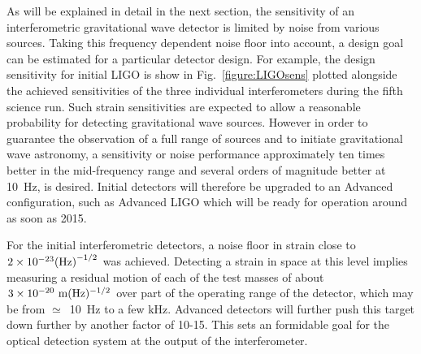 \documentclass{article}
\begin{document}
As will be explained in detail in the next section, the sensitivity of
an interferometric gravitational wave detector is limited by noise
from various sources. Taking this frequency dependent noise floor into
account, a design goal can be estimated for a particular detector design.
For example, the design sensitivity for initial LIGO is show in Fig.~\ref{figure:LIGOsens}
plotted alongside the achieved sensitivities of the three individual interferometers
during the fifth science run. Such strain sensitivities are expected to allow a reasonable
probability for detecting gravitational wave sources. However in order to guarantee the observation
of a full range of sources and to initiate gravitational wave
astronomy, a sensitivity or noise performance approximately ten times
better in the mid-frequency range and several orders of magnitude
better at 10~Hz, is desired. Initial detectors will therefore be upgraded to an Advanced
configuration, such as Advanced LIGO which will be ready for operation around as soon as 2015.


For the initial interferometric detectors, a noise floor in
strain close to $2 \times 10^{-23}{(\rm Hz)}^{-1/2}$ was achieved.
Detecting a strain in space at this level implies measuring a residual motion of each of the test
masses of about $3 \times 10^{-20} {\rm \ m}(\rm Hz)^{-1/2}$ over part
of the operating range of the detector, which may be from
$\simeq$~10~Hz to a few kHz. Advanced detectors will further push this target down further by
another factor of 10-15. This sets an formidable goal for the
optical detection system at the output of the interferometer.
\end{document}
